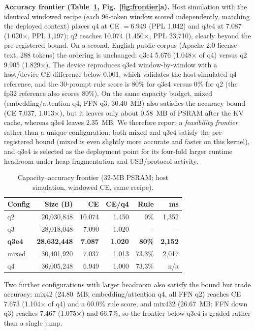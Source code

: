 \documentclass[journal,letterpaper]{IEEEtran}
\begin{document}
\textbf{Accuracy frontier (Table~\ref{tab:frontier}, Fig.~\ref{fig:frontier}a).} Host simulation with the identical windowed recipe (each 96-token window
scored independently, matching the deployed context) places q4 at CE $=6.949$ (PPL 1,042) and
q3e4 at 7.087 (1.020$\times$, PPL 1,197); q2 reaches 10.074 (1.450$\times$, PPL 23,710), clearly
beyond the pre-registered bound. On a second, English public corpus (Apache-2.0 license text,
288 tokens) the ordering is unchanged: q3e4 5.676 (1.048$\times$ of q4) versus q2 9.905
(1.829$\times$). The device reproduces q3e4 window-by-window with a host/device CE difference
below 0.001, which validates the host-simulated q4 reference, and the 30-prompt rule score is
80\% for q3e4 versus 0\% for q2 (the fp32 reference also scores 80\%). On the same capacity budget, mixed
(embedding/attention q4, FFN q3; 30.40~MB) also satisfies the accuracy bound (CE 7.037,
1.013$\times$), but it leaves only about 0.58~MB of PSRAM after the KV cache, whereas q3e4 leaves
2.35~MB. We therefore report a \emph{feasibility frontier} rather than a unique configuration:
both mixed and q3e4 satisfy the pre-registered bound (mixed is even slightly more accurate and
faster on this kernel), and q3e4 is selected as the deployment point for its four-fold larger
runtime headroom under heap fragmentation and USB/protocol activity.

\begin{table}[t]
\centering
\caption{Capacity--accuracy frontier (32-MB PSRAM; host simulation, windowed CE, same recipe).}
\label{tab:frontier}
\footnotesize
\setlength{\tabcolsep}{2.5pt}
\begin{tabular}{@{}lrrrrr@{}}
\toprule
Config & Size (B) & CE & CE/q4 & Rule & ms \\
\midrule
q2 & 20,030,848 & 10.074 & 1.450 & 0\% & 1,352 \\
q3 & 28,018,048 & 7.090 & 1.020 & -- & -- \\
\textbf{q3e4} & \textbf{28,632,448} & \textbf{7.087} & \textbf{1.020} & \textbf{80\%} & \textbf{2,152} \\
mixed & 30,401,920 & 7.037 & 1.013 & 73.3\% & 2,017 \\
q4 & 36,005,248 & 6.949 & 1.000 & 73.3\% & n/a \\
\bottomrule
\end{tabular}
\end{table}

Two further configurations with larger headroom also satisfy the bound but trade accuracy:
mix42 (24.80~MB; embedding/attention q4, all FFN q2) reaches CE 7.673 (1.104$\times$ of q4) and a
60.0\% rule score, and mix432 (26.67~MB; FFN down q3) reaches 7.467 (1.075$\times$) and 66.7\%,
so the frontier below q3e4 is graded rather than a single jump.
\end{document}
